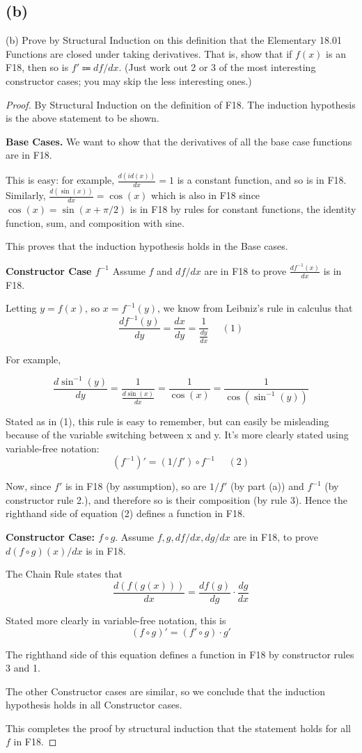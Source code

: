 \documentclass[14pt]{extarticle}
\begin{document}
\subsection{(b)}
(b) Prove by Structural Induction on this definition that the Elementary 18.01 Functions are closed under taking derivatives. That is, show that if $f(x)$ is an F18, then so is $f' \Coloneqq df/dx$. (Just work out 2 or 3 of the most interesting constructor cases; you may skip the less interesting ones.)
\begin{proof}
By Structural Induction on the definition of F18. The induction hypothesis is the above statement to be shown.

{\bf Base Cases.} We want to show that the derivatives of all the base case functions are in F18.

This is easy: for example, $\frac{d(id(x))}{dx} = 1$ is a constant function, and so is in F18. Similarly, $\frac{d(\sin(x))}{dx} = \cos(x)$ which is also in F18 since $\cos(x) = \sin(x + \pi/2)$ is in F18 by rules for constant functions, the identity function, sum, and composition with sine.

This proves that the induction hypothesis holds in the Base cases.

{\bf Constructor Case $f^{-1}$} Assume $f$ and $df/dx$ are in F18 to prove $\frac{df^{-1}(x)}{dx}$ is in F18. 

Letting $y = f(x)$, so $x = f^{-1}(y)$, we know from Leibniz’s rule in calculus that 
$$
\frac{df^{-1}(y)}{dy} = \frac{dx}{dy} = \frac{1}{\frac{dy}{dx}} \,\,\,\,\,\,\,\,(1)
$$

For example, 

$$
\frac{d\sin^{-1}(y)}{dy} = \frac{1}{\frac{d \sin(x)}{dx}} = \frac{1}{\cos(x)} = \frac{1}{\cos(\sin^{-1}(y))}
$$

Stated as in (1), this rule is easy to remember, but can easily be misleading because of the variable switching between x and y. It’s more clearly stated using variable-free notation:
$$
(f^{-1})' = (1/f') \circ f^{-1} \,\,\,\,\,\,\,\,(2)
$$

Now, since $f'$ is in F18 (by assumption), so are $1/f'$ (by part (a)) and $f^{-1}$ (by constructor rule 2.), and therefore so is their composition (by rule 3). Hence the righthand side of equation (2) defines a function in F18.

{\bf Constructor Case: $f \circ g$}. Assume $f, g, df/dx, dg/dx$ are in F18, to prove $d(f \circ g)(x)/dx$ is in F18.

The Chain Rule states that
$$
\frac{d(f(g(x)))}{dx} = \frac{df(g)}{dg}\cdot\frac{dg}{dx}
$$

Stated more clearly in variable-free notation, this is
$$
(f \circ g)' = (f' \circ g) \cdot g'
$$

The righthand side of this equation defines a function in F18 by constructor rules 3 and 1.

The other Constructor cases are similar, so we conclude that the induction hypothesis holds in all Constructor cases.

This completes the proof by structural induction that the statement holds for all $f$ in F18.
\end{proof}
\end{document}
